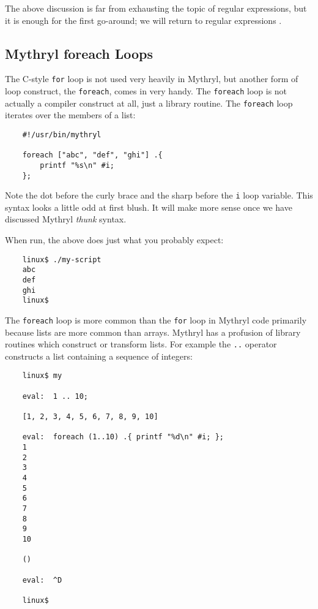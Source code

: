 The above discussion is far from exhausting the topic of regular 
expressions, but it is enough for the first go-around;  we will 
return to regular expressions .




\cutend*

\subsection{Mythryl foreach Loops}

The C-style {\tt for} loop is not used very heavily in Mythryl, but another 
form of loop construct, the {\tt foreach}, comes in very handy. 
The {\tt foreach} loop is not actually a compiler construct at all, just a library routine.  The 
{\tt foreach} loop iterates over the members of a list:

\begin{verbatim}
    #!/usr/bin/mythryl

    foreach ["abc", "def", "ghi"] .{
        printf "%s\n" #i;
    };
\end{verbatim}

Note the dot before the curly brace and the sharp before the {\tt i} 
loop variable.  This syntax looks a little odd at first blush. 
It will make more sense once we have discussed Mythryl {\it thunk} syntax. 

When run, the above does just what you probably expect:

\begin{verbatim}
    linux$ ./my-script
    abc
    def
    ghi
    linux$
\end{verbatim}

The {\tt foreach} loop is more common than the {\tt for} loop in  
Mythryl code primarily because lists are more common than arrays. 
Mythryl has a profusion of library routines 
which construct or transform lists.  For example the {\tt ..} operator 
constructs a list containing a sequence of integers:

\begin{verbatim}
    linux$ my

    eval:  1 .. 10;

    [1, 2, 3, 4, 5, 6, 7, 8, 9, 10]

    eval:  foreach (1..10) .{ printf "%d\n" #i; };
    1
    2
    3
    4
    5
    6
    7
    8
    9
    10

    ()

    eval:  ^D

    linux$
\end{verbatim}

